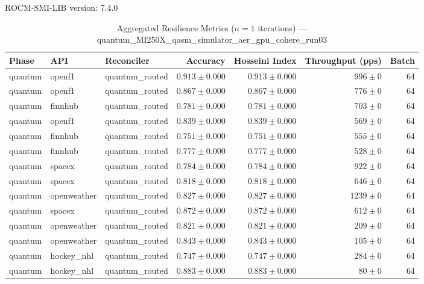 ROCM-SMI-LIB version: 7.4.0

\begin{table}[htbp]
\caption{Aggregated Resilience Metrics ($n=1$ iterations) --- quantum_MI250X_qasm_simulator_aer_gpu_cohere_run03}
\begin{tabular}{l l l r r r r}
\hline
Phase & API & Reconciler & Accuracy & Hosseini Index & Throughput (pps) & Batch \\
\hline
quantum & openf1 & quantum\_routed & $0.913\pm0.000$ & $0.913\pm0.000$ & $996\pm0$ & 64 \\
quantum & openf1 & quantum\_routed & $0.867\pm0.000$ & $0.867\pm0.000$ & $776\pm0$ & 64 \\
quantum & finnhub & quantum\_routed & $0.781\pm0.000$ & $0.781\pm0.000$ & $703\pm0$ & 64 \\
quantum & openf1 & quantum\_routed & $0.839\pm0.000$ & $0.839\pm0.000$ & $569\pm0$ & 64 \\
quantum & finnhub & quantum\_routed & $0.751\pm0.000$ & $0.751\pm0.000$ & $555\pm0$ & 64 \\
quantum & finnhub & quantum\_routed & $0.777\pm0.000$ & $0.777\pm0.000$ & $528\pm0$ & 64 \\
quantum & spacex & quantum\_routed & $0.784\pm0.000$ & $0.784\pm0.000$ & $922\pm0$ & 64 \\
quantum & spacex & quantum\_routed & $0.818\pm0.000$ & $0.818\pm0.000$ & $646\pm0$ & 64 \\
quantum & openweather & quantum\_routed & $0.827\pm0.000$ & $0.827\pm0.000$ & $1239\pm0$ & 64 \\
quantum & spacex & quantum\_routed & $0.872\pm0.000$ & $0.872\pm0.000$ & $612\pm0$ & 64 \\
quantum & openweather & quantum\_routed & $0.821\pm0.000$ & $0.821\pm0.000$ & $209\pm0$ & 64 \\
quantum & openweather & quantum\_routed & $0.843\pm0.000$ & $0.843\pm0.000$ & $105\pm0$ & 64 \\
quantum & hockey\_nhl & quantum\_routed & $0.747\pm0.000$ & $0.747\pm0.000$ & $284\pm0$ & 64 \\
quantum & hockey\_nhl & quantum\_routed & $0.883\pm0.000$ & $0.883\pm0.000$ & $80\pm0$ & 64 \\

\end{tabular}
\end{table}
